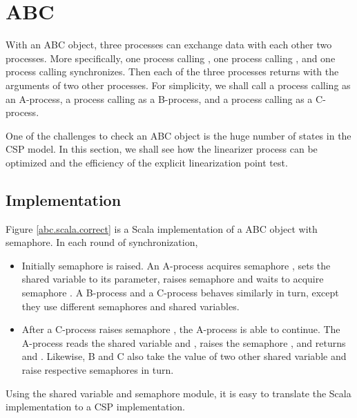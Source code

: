 \documentclass{article}
\begin{document}
\newpage
\section{ABC}
With an ABC object, three processes can exchange data with each other two processes. More specifically, one process calling , one process calling , and one process calling  synchronizes. Then each of the three processes returns with the arguments of two other processes. For simplicity, we shall call a process calling  as an A-process, a process calling  as a B-process, and a process calling  as a C-process. 

One of the challenges to check an ABC object is the huge number of states in the CSP model. In this section, we shall see how the linearizer process can be optimized and the efficiency of the explicit linearization point test.

\subsection{Implementation}
Figure \ref{abc.scala.correct} is a Scala implementation of a ABC object with semaphore. In each round of synchronization,
\begin{itemize}
    \item Initially semaphore  is raised. An A-process acquires semaphore , sets the shared variable  to its parameter, raises semaphore  and waits to acquire semaphore . A B-process and a C-process behaves similarly in turn, except they use different semaphores and shared variables. 
    \item After a C-process raises semaphore , the A-process is able to continue. The A-process reads the shared variable  and , raises the semaphore , and returns  and . Likewise, B and C also take the value of two other shared variable and raise respective semaphores in turn.
\end{itemize}

Using the shared variable and semaphore module, it is easy to translate the Scala implementation to a CSP implementation.
\end{document}
